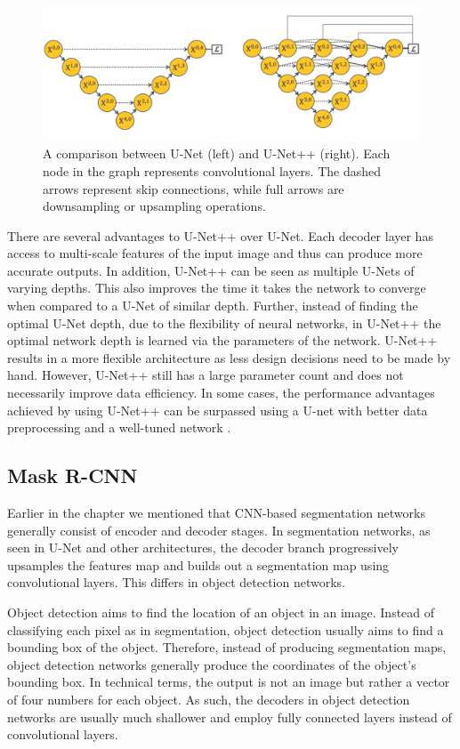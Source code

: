  \begin{figure}[h!]
 \centering
 \includegraphics[width=\linewidth]{images/unetpp-arch}
 \caption{A comparison between U-Net (left) and U-Net++ (right). Each node in the graph represents convolutional layers. The dashed arrows represent skip connections, while full arrows are downsampling or upsampling operations. \cite{zhou2019unetplusplus}}
 \label{fig:unetpp-arch}
 \end{figure}
 
There are several advantages to U-Net++ over U-Net. Each decoder layer has access to multi-scale features of the input image and thus can produce more accurate outputs. In addition, U-Net++ can be seen as multiple U-Nets of varying depths. This also improves the time it takes the network to converge when compared to a U-Net of similar depth. Further, instead of finding the optimal U-Net depth, due to the flexibility of neural networks, in U-Net++ the optimal network depth is learned via the parameters of the network. U-Net++ results in a more flexible architecture as less design decisions need to be made by hand. However, U-Net++ still has a large parameter count and does not necessarily improve data efficiency. In some cases, the performance advantages achieved by using U-Net++ can be surpassed using a U-net with better data preprocessing and a well-tuned network \cite{isenseeNnUNetSelfconfiguringMethod2021}.

\subsection{Mask R-CNN}

Earlier in the chapter we mentioned that CNN-based segmentation networks generally consist of encoder and decoder stages. In segmentation networks, as seen in U-Net and other architectures, the decoder branch progressively upsamples the features map and builds out a segmentation map using convolutional layers. This differs in object detection networks.

Object detection aims to find the location of an object in an image. Instead of classifying each pixel as in segmentation, object detection usually aims to find a bounding box of the object. Therefore, instead of producing segmentation maps, object detection networks generally produce the coordinates of the object's bounding box. In technical terms, the output is not an image but rather a vector of four numbers for each object. As such, the decoders in object detection networks are usually much shallower and employ fully connected layers instead of convolutional layers. 

